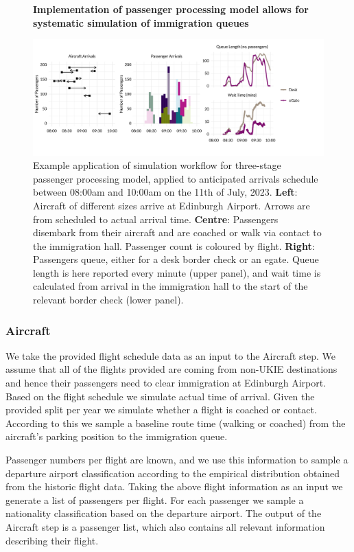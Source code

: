 \documentclass[10pt]{article}
\newcommand*{\figuretitle}[1]{%
    {\centering%
    \textbf{#1}%
    \par\medskip}%
}
\begin{document}
\begin{figure}[!ht]
    \centering
    \figuretitle{Implementation of passenger processing model allows for systematic simulation of immigration queues}
    \includegraphics[width=1.1\textwidth]{figures/workflow_fig.png}
     \caption{Example application of simulation workflow for three-stage passenger processing model, applied to anticipated arrivals schedule between 08:00am and 10:00am on the 11th of July, 2023. \textbf{Left}: Aircraft of different sizes arrive at Edinburgh Airport. Arrows are from scheduled to actual arrival time. \textbf{Centre}: Passengers disembark from their aircraft and are coached or walk via contact to the immigration hall. Passenger count is coloured by flight. \textbf{Right}: Passengers queue, either for a desk border check or an \gls{egate}. Queue length is here reported every minute (upper panel), and wait time is calculated from arrival in the immigration hall to the start of the relevant border check (lower panel).} \label{fig:workflow_fig}
\end{figure}

\subsubsection{Aircraft}
We take the provided flight schedule data as an input to the Aircraft step. We assume that all of the flights provided are coming from non-UKIE destinations and hence their passengers need to clear immigration at Edinburgh Airport. Based on the flight schedule we simulate actual time of arrival. Given the provided split per year we simulate whether a flight is coached or contact. According to this we sample a baseline route time (walking or coached) from the aircraft's parking position to the immigration queue. 

Passenger numbers per flight are known, and we use this information to sample a departure airport classification according to the empirical distribution obtained from the historic flight data. Taking the above flight information as an input we generate a list of passengers per flight. For each passenger we sample a nationality classification based on the departure airport. The output of the Aircraft step is a passenger list, which also contains all relevant information describing their flight.
\end{document}

